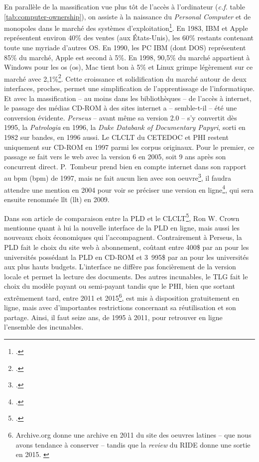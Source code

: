 En parallèle de la massification vue plus tôt de l'accès à l'ordinateur (\textit{c.f.} table \ref{tab:computer-ownership}), on assiste à la naissance du \textit{Personal Computer} et de monopoles dans le marché des systèmes d'exploitation\footcite{schlender_whos_1990}. En 1983, IBM et Apple représentent environ 40\% des ventes (aux États-Unis), les 60\% restants contenant toute une myriade d'autres OS. En 1990, les PC IBM (dont DOS) représentent 85\% du marché, Apple est second à 5\%. En 1998, 90,5\% du marché appartient à Windows pour les \acrfull{os} (\acrshort{os}), Mac tient bon à 5\% et Linux grimpe légèrement sur ce marché avec 2,1\%\footcite{miles_windows_1999, reimer_total_2005}. Cette croissance et solidification du marché autour de deux interfaces, proches, permet une simplification de l'apprentissage de l'informatique. Et avec la massification -- au moins dans les bibliothèques -- de l'accès à internet, le passage des médias CD-ROM à des sites internet a -- semble-t-il -- été une conversion évidente. \textit{Perseus} -- avant même sa version 2.0 -- s'y convertit dès 1995, la \textit{Patrologia} en 1996, la \textit{Duke Databank of Documentary Papyri}, sorti en 1982 sur bandes, en 1996 aussi. Le CLCLT du CETEDOC  et PHI restent uniquement sur CD-ROM en 1997 parmi les corpus originaux. Pour le premier, ce passage se fait vers le web avec la version 6 en 2005, soit 9 ans après son concurrent direct. P.~Tombeur prend bien en compte internet dans son rapport au \acrfull{bpm} (\acrshort{bpm}) de 1997, mais ne fait aucun lien avec son oeuvre\footcite{tombeur_informatique_1997}, il faudra attendre une mention en 2004 pour voir se préciser une version en ligne\footcite{tombeur_augustin_2004}, qui sera ensuite renommée \acrfull{llt} (\acrshort{llt}) en 2009.

Dans son article de comparaison entre la PLD et le CLCLT\footcite{crown_comparing_2000}, Ron W. Crown mentionne quant à lui la nouvelle interface de la PLD en ligne, mais aussi les nouveaux choix économiques qui l'accompagnent. Contrairement à Perseus, la PLD fait le choix du site web à abonnement, coûtant entre 400\$ par an pour les universités possédant la PLD en CD-ROM et 3~995\$ par an pour les universités aux plus hauts budgets. L'interface ne diffère pas foncièrement de la version locale et permet la lecture des documents. Des autres incunables, le TLG fait le choix du modèle payant ou semi-payant tandis que le PHI, bien que sortant extrêmement tard, entre 2011 et 2015\footnote{Archive.org donne une archive en 2011 du site des oeuvres latines -- que nous avons tendance à conserver -- tandis que la \textit{review} du RIDE donne une sortie en 2015. \cite{daniel_kozak_classical_2018}}, est mis à disposition gratuitement en ligne, mais avec d'importantes restrictions concernant sa réutilisation et son partage. Ainsi, il faut seize ans, de 1995 à 2011, pour retrouver en ligne l'ensemble des incunables. 

